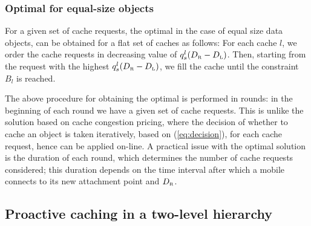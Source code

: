 \documentclass[conference]{IEEEtran}
\newcommand{\mynote}[1]{{{\medskip
\footnotesize \em \noindent Note: #1}}\medskip}
\renewcommand{\mynote}[1]{}
\newcommand{\Leaf}{\mbox{\tiny L}}
\newcommand{\R}{\mbox{\tiny R}}
\begin{document}
\subsubsection{Optimal for equal-size objects}
\label{sec:opt}

\mynote{
Key points:
\begin{itemize}
\item Problem assumes some set of cache requests, and seeks to find which and where to cache objects.
\item Optimal solution is implemented in rounds.
\end{itemize}
}

For a given set of cache requests, the optimal in the case of equal size data objects, can be obtained for a flat set of caches as follows: For each cache $l$, we order the cache requests in  decreasing value of $q^l_s(D_{\R}-D_{\Leaf})$. Then, starting from the request with the highest $q^l_s(D_{\R}-D_{\Leaf})$, we fill the cache until the constraint $B_l$ is reached.

The above procedure for obtaining the optimal is performed in rounds: in the beginning of each round we have a given set of cache requests. This is unlike the solution based on cache congestion pricing, where the decision of whether to cache an object is taken iteratively, based on (\ref{eq:decision}), for each cache request, hence can be applied on-line.
A practical issue with the optimal solution is the duration of each round, which determines the number of cache requests considered; this duration depends on the time interval after which a mobile connects to its new attachment point and $D_{\R}$.

\vspace{-0.10in}
\subsection{Proactive caching in a two-level hierarchy}
\label{sec:two-level}
\vspace{-0.03in}

\mynote{
\begin{itemize}
\item  Show why problem is difficult, prove NP.
\item Separate problem to solution of two problems, which consider a single-level cache set, hence can be solved distributed as in previous subsection. Then, from the two solutions take the one that yields smallest delay.
\item Show communication of information between middle cache and leaf caches. Figure with two-levels of caches.
\item When there are two or more mid-level caches, then each mid-level cache implements same procedure described. Each leaf cache is child of one mid-level cache.
\item possibly add pseudocode algorithm to make approach explicit/clear.
\item Alternative: maintain a congestion price for mid-level cache. Decide to cache object in mid-level cache only if Delay(object fetched in mid-level cache)-Delay(object not fetched in mid-level cache) $\geq$ $p_{\mbox{\tiny mid-level cache}}$.
    \end{itemize}
}
\end{document}
